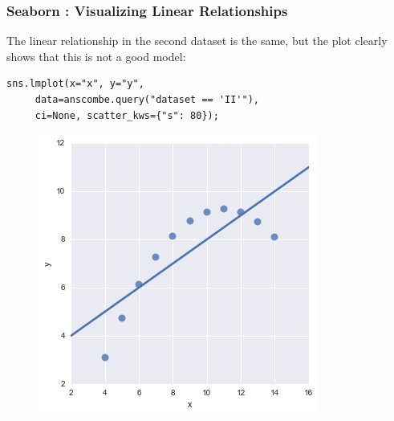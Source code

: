 \documentclass{beamer}
\begin{document}
\begin{frame}[fragile]
\frametitle{Seaborn : Visualizing Linear Relationships}
\large	
The linear relationship in the second dataset is the same, but the plot clearly shows that this is not a good model:
\begin{framed}
	\begin{verbatim}
sns.lmplot(x="x", y="y", 
     data=anscombe.query("dataset == 'II'"),
     ci=None, scatter_kws={"s": 80});
                  \end{verbatim}
                \end{framed}
\begin{figure}
	\centering
	\includegraphics[width=0.7\linewidth]{images/regression_21_0}
\end{figure}


\end{frame}
\end{document}
